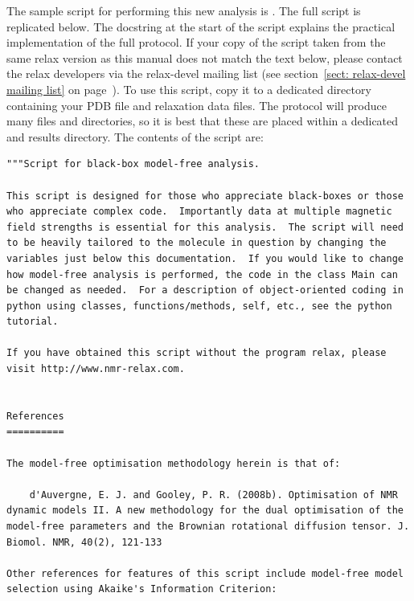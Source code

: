 \begin{htmlonly}
\begin{htmlonly}
The sample script for performing this new analysis is .  The full script is replicated below.  The docstring at the start of the script explains the practical implementation of the full protocol.  If your copy of the  script taken from the same relax version as this manual does not match the text below, please contact the relax developers via the relax-devel mailing list (see section~\ref{sect: relax-devel mailing list} on page~\pageref{sect: relax-devel mailing list}).  To use this script, copy it to a dedicated directory containing your PDB file and relaxation data files.  The protocol will produce many files and directories, so it is best that these are placed within a dedicated and results directory.  The contents of the script are:

\begin{lstlisting}
"""Script for black-box model-free analysis.

This script is designed for those who appreciate black-boxes or those who appreciate complex code.  Importantly data at multiple magnetic field strengths is essential for this analysis.  The script will need to be heavily tailored to the molecule in question by changing the variables just below this documentation.  If you would like to change how model-free analysis is performed, the code in the class Main can be changed as needed.  For a description of object-oriented coding in python using classes, functions/methods, self, etc., see the python tutorial.

If you have obtained this script without the program relax, please visit http://www.nmr-relax.com.


References
==========

The model-free optimisation methodology herein is that of:

    d'Auvergne, E. J. and Gooley, P. R. (2008b). Optimisation of NMR dynamic models II. A new methodology for the dual optimisation of the model-free parameters and the Brownian rotational diffusion tensor. J. Biomol. NMR, 40(2), 121-133

Other references for features of this script include model-free model selection using Akaike's Information Criterion:


\end{lstlisting}
\end{htmlonly}
\end{htmlonly}

